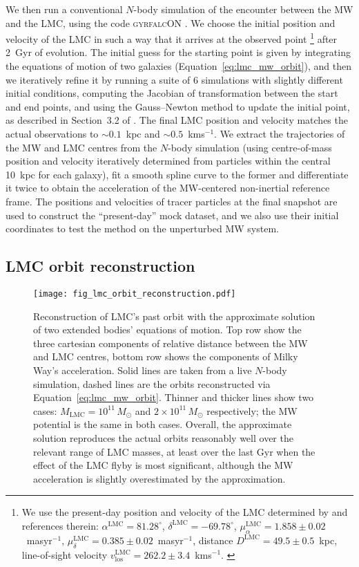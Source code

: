 \documentclass[usenatbib,fleqn]{mnras}
\newcommand{\kms}{km\:s$^{-1}$\xspace}
\newcommand{\masyr}{mas\:yr$^{-1}$\xspace}
\begin{document}
We then run a conventional $N$-body simulation of the encounter between the MW and the LMC, using the code \textsc{gyrfalcON} \citep{Dehnen2000}. We choose the initial position and velocity of the LMC in such a way that it arrives at the observed point%
\footnote{We use the present-day position and velocity of the LMC determined by \citet{Luri2021} and references therein: $\alpha^\text{LMC}=81.28^\circ$, $\delta^\text{LMC}=-69.78^\circ$, $\mu_\alpha^\text{LMC}=1.858\pm0.02$~\masyr, $\mu_\delta^\text{LMC}=0.385\pm0.02$~\masyr, distance $D^\text{LMC}=49.5\pm0.5$~kpc, line-of-sight velocity $v_\text{los}^\text{LMC}=262.2\pm3.4$~\kms. \label{footnote:LMCcoords}}
after 2~Gyr of evolution. The initial guess for the starting point is given by integrating the equations of motion of two galaxies (Equation~\ref{eq:lmc_mw_orbit}), and then we iteratively refine it by running a suite of 6 simulations with slightly different initial conditions, computing the Jacobian of transformation between the start and end points, and using the Gauss--Newton method to update the initial point, as described in Section~3.2 of \citet{Vasiliev2021b}. The final LMC position and velocity matches the actual observations to $\sim0.1$~kpc and $\sim0.5$~\kms. We extract the trajectories of the MW and LMC centres from the $N$-body simulation (using centre-of-mass position and velocity iteratively determined from particles within the central 10~kpc for each galaxy), fit a smooth spline curve to the former and differentiate it twice to obtain the acceleration of the MW-centered non-inertial reference frame. The positions and velocities of tracer particles at the final snapshot are used to construct the ``present-day'' mock dataset, and we also use their initial coordinates to test the method on the unperturbed MW system.

\subsection{LMC orbit reconstruction}  \label{sec:test_lmc_orbit}

\begin{figure*}
\texttt{[image: fig\_lmc\_orbit\_reconstruction.pdf]}
\caption{Reconstruction of LMC's past orbit with the approximate solution of two extended bodies' equations of motion. Top row show the three cartesian components of relative distance between the MW and LMC centres, bottom row shows the components of Milky Way's acceleration. Solid lines are taken from a live $N$-body simulation, dashed lines are the orbits reconstructed via Equation~\ref{eq:lmc_mw_orbit}. Thinner and thicker lines show two cases: $M_\text{LMC}=10^{11}\,M_\odot$ and $2\times10^{11}\,M_\odot$ respectively; the MW potential is the same in both cases. Overall, the approximate solution reproduces the actual orbits reasonably well over the relevant range of LMC masses, at least over the last Gyr when the effect of the LMC flyby is most significant, although the MW acceleration is slightly overestimated by the approximation.
}  \label{fig:lmc_orbit_reconstruction}
\end{figure*}
\end{document}
